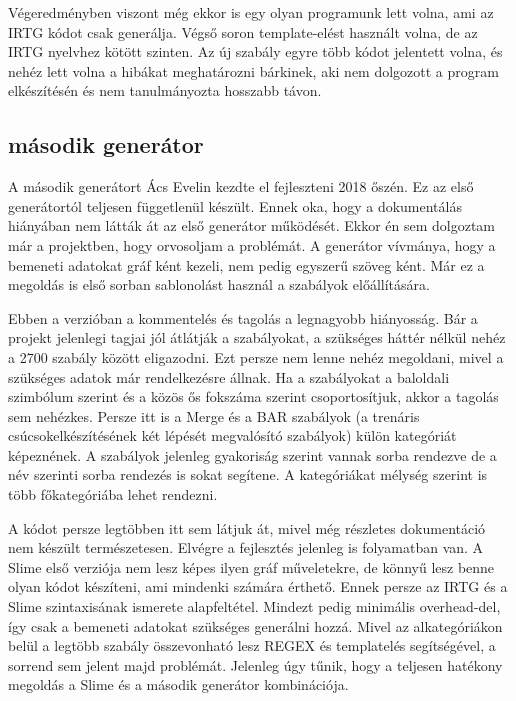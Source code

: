 Végeredményben viszont még ekkor is egy olyan programunk lett volna, ami az IRTG kódot csak generálja. Végső soron template-elést használt volna, de az IRTG nyelvhez kötött szinten. Az új szabály egyre több kódot jelentett volna, és nehéz lett volna a hibákat meghatározni bárkinek, aki nem dolgozott a program elkészítésén és nem tanulmányozta hosszabb távon.


\subsection{második generátor}
\label{sec:generator2}
A második generátort Ács Evelin kezdte el fejleszteni 2018 őszén.
Ez az első generátortól teljesen függetlenül készült.
Ennek oka, hogy a dokumentálás hiányában nem látták át az első generátor működését.
Ekkor én sem dolgoztam már a projektben, hogy orvosoljam a problémát.
A generátor vívmánya, hogy a bemeneti adatokat gráf ként kezeli, nem pedig egyszerű szöveg ként.
Már ez a megoldás is első sorban sablonolást használ a szabályok előállítására.

Ebben a verzióban a kommentelés és tagolás a legnagyobb hiányosság. 
Bár a projekt jelenlegi tagjai jól átlátják a szabályokat, a szükséges háttér nélkül nehéz a 2700 szabály között eligazodni. 
Ezt persze nem lenne nehéz megoldani, mivel a szükséges adatok már rendelkezésre állnak. 
Ha a szabályokat a baloldali szimbólum szerint és a közös ős fokszáma szerint csoportosítjuk, akkor a tagolás sem nehézkes. 
Persze itt is a Merge és a BAR szabályok (a trenáris csúcsokelkészítésének két lépését megvalósító szabályok) külön kategóriát képeznének. 
A szabályok jelenleg gyakoriság szerint vannak sorba rendezve de a név szerinti sorba rendezés is sokat segítene. 
A kategóriákat mélység szerint is több főkategóriába lehet rendezni.

A kódot persze legtöbben itt sem látjuk át, mivel még részletes dokumentáció nem készült természetesen.
Elvégre a fejlesztés jelenleg is folyamatban van. 
A Slime első verziója nem lesz képes ilyen gráf műveletekre, de könnyű lesz benne olyan kódot készíteni, ami mindenki számára érthető.
Ennek persze az IRTG és a Slime szintaxisának ismerete alapfeltétel. 
Mindezt pedig minimális overhead-del, így csak a bemeneti adatokat szükséges generálni hozzá. 
Mivel az alkategóriákon belül a legtöbb szabály összevonható lesz REGEX és templatelés segítségével, a sorrend sem jelent majd problémát.
Jelenleg úgy tűnik, hogy a teljesen hatékony megoldás a Slime és a második generátor kombinációja.